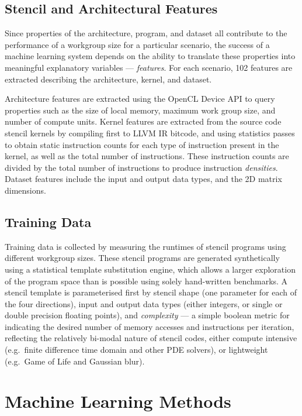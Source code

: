 \documentclass[preprint,nonatbib,10pt,nocopyrightspace]{sigplanconf}
\begin{document}
\subsection{Stencil and Architectural Features}

Since properties of the architecture, program, and dataset all contribute to the
performance of a workgroup size for a particular scenario, the success of a
machine learning system depends on the ability to translate these properties
into meaningful explanatory variables --- \emph{features}. For each scenario,
102 features are extracted describing the architecture, kernel, and dataset.

Architecture features are extracted using the OpenCL Device API to query
properties such as the size of local memory, maximum work group size, and number
of compute units. Kernel features are extracted from the source code stencil
kernels by compiling first to LLVM IR bitcode, and using statistics passes to
obtain static instruction counts for each type of instruction present in the
kernel, as well as the total number of instructions. These instruction counts
are divided by the total number of instructions to produce instruction
\emph{densities}. Dataset features include the input and output data
types, and the 2D matrix dimensions.


\subsection{Training Data}\label{subsec:training}

Training data is collected by measuring the runtimes of stencil programs using
different workgroup sizes. These stencil programs are generated synthetically
using a statistical template substitution engine, which allows a larger
exploration of the program space than is possible using solely hand-written
benchmarks. A stencil template is parameterised first by stencil shape (one
parameter for each of the four directions), input and output data types (either
integers, or single or double precision floating points), and \emph{complexity}
--- a simple boolean metric for indicating the desired number of memory accesses
and instructions per iteration, reflecting the relatively bi-modal nature of
stencil codes, either compute intensive (e.g.\ finite difference time domain and
other PDE solvers), or lightweight (e.g.\ Game of Life and Gaussian blur).


\section{Machine Learning Methods}\label{sec:ml}
\end{document}
